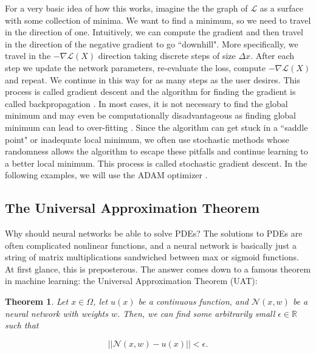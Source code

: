\documentclass{CUP-JNL-DTM}%
\newtheorem{theorem}{Theorem}[section]
\theoremstyle{definition}
\numberwithin{equation}{section}
\newcommand{\loss}{\mathcal{L}}
\newcommand{\net}{\mathcal{N}}
\begin{document}
For a very basic idea of how this works, imagine the the graph of $\loss$ as a surface with some collection of minima. We want to find a minimum, so we need to travel in the direction of one. Intuitively, we can compute the gradient and then travel in the direction of the negative gradient to go ``downhill". More specifically, we travel in the $-\nabla \loss(X)$ direction taking discrete steps of size $\Delta x$. After each step we update the network parameters, re-evaluate the loss, compute $-\nabla \loss(X)$ and repeat. We continue in this way for as many steps as the user desires. This process is called gradient descent and the algorithm for finding the gradient is called backpropagation \cite{chauvinBackpropagationTheoryArchitectures1995}. In most cases, it is not necessary to find the global minimum and may even be computationally disadvantageous as finding global minimum can lead to over-fitting \cite{choromanskaLossSurfacesMultilayer2015}. Since the algorithm can get stuck in a ``saddle point" or inadequate local minimum, we often use stochastic methods whose randomness allows the algorithm to escape these pitfalls and continue learning to a better local minimum. This process is called stochastic gradient descent. In the following examples, we will use the ADAM optimizer \cite{kingmaAdamMethodStochastic2017}. 


\subsection{The Universal Approximation Theorem}

Why should neural networks be able to solve PDEs? The solutions to PDEs are often complicated nonlinear functions, and a neural network is basically just a string of matrix multiplications sandwiched between max or sigmoid functions. At first glance, this is preposterous. The answer comes down to a famous theorem in machine learning: the Universal Approximation Theorem (UAT):

\begin{theorem}

Let $x \in \Omega$, let $u(x)$ be a continuous function, and $\net(x,w)$ be a neural network with weights $w$. Then, we can find some arbitrarily small $\epsilon \in \mathbb{R}$ such that 

\begin{equation}
	||\net(x,w) - u(x)|| < \epsilon. 
\end{equation}

\end{theorem}
\end{document}
